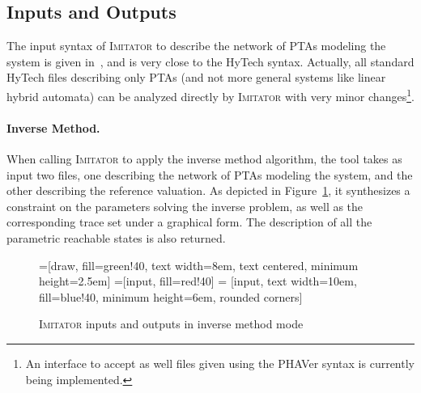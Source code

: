 \documentclass[a4paper,10pt]{article}
\newcommand{\A}{\mathcal{A}}
\newcommand{\hytech}{{\sc HyTech}}
\newcommand{\imitator}{\textsc{Imitator}}
\newcommand{\phaver}{PHAVer}
\newcommand{\paragraphe}[1]{\paragraph{#1.}}
\begin{document}
\subsection{Inputs and Outputs}

The input syntax of \imitator{} to describe the network of PTAs modeling the system is given in~\cite{imitator2_web}, and is very close to the \hytech{} syntax.
Actually, all standard \hytech{} files describing only PTAs (and not more general systems like linear hybrid automata\cite{achh92}) can be analyzed directly by \imitator{} with very minor changes\footnote{An interface to accept as well files given using the \phaver{} syntax is currently being implemented.}.


\paragraphe{Inverse Method}
When calling \imitator{} to apply the inverse method algorithm, the tool takes as input two files, one describing the network of PTAs modeling the system, and the other describing the reference valuation.
As depicted in Figure~\ref{fig:ioIM}, it synthesizes a constraint on the parameters solving the inverse problem, as well as the corresponding trace set under a graphical form.
The description of all the parametric reachable states is also returned.

\begin{figure}[ht!]
=[draw, fill=green!40, text width=8em,
    text centered, minimum height=2.5em]
=[input, fill=red!40]
 = [input, text width=10em, fill=blue!40,
    minimum height=6em, rounded corners]
\def\blockdist{2.3}
\def\edgedist{2.5}

{

\centering


}

\caption{\imitator{} inputs and outputs in inverse method mode}
\label{fig:ioIM}
\end{figure}
\end{document}
